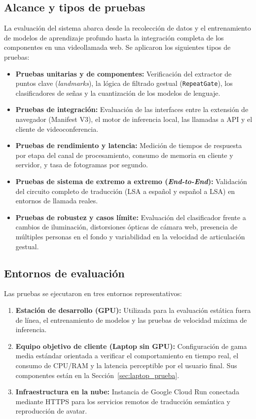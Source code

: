 \subsection{Alcance y tipos de pruebas}
La evaluación del sistema abarca desde la recolección de datos y el entrenamiento de modelos de aprendizaje profundo hasta la integración completa de los componentes en una videollamada web. Se aplicaron los siguientes tipos de pruebas:
\begin{itemize}
    \item \textbf{Pruebas unitarias y de componentes:} Verificación del extractor de puntos clave (\textit{landmarks}), la lógica de filtrado gestual (\texttt{RepeatGate}), los clasificadores de señas y la cuantización de los modelos de lenguaje.
    \item \textbf{Pruebas de integración:} Evaluación de las interfaces entre la extensión de navegador (Manifest V3), el motor de inferencia local, las llamadas a API y el cliente de videoconferencia.
    \item \textbf{Pruebas de rendimiento y latencia:} Medición de tiempos de respuesta por etapa del canal de procesamiento, consumo de memoria en cliente y servidor, y tasa de fotogramas por segundo.
    \item \textbf{Pruebas de sistema de extremo a extremo (\textit{End-to-End}):} Validación del circuito completo de traducción (LSA a español y español a LSA) en entornos de llamada reales.
    \item \textbf{Pruebas de robustez y casos límite:} Evaluación del clasificador frente a cambios de iluminación, distorsiones ópticas de cámara web, presencia de múltiples personas en el fondo y variabilidad en la velocidad de articulación gestual.
\end{itemize}

\subsection{Entornos de evaluación}
Las pruebas se ejecutaron en tres entornos representativos:
\begin{enumerate}
    \item \textbf{Estación de desarrollo (GPU):} Utilizada para la evaluación estática fuera de línea, el entrenamiento de modelos y las pruebas de velocidad máxima de inferencia.
    \item \textbf{Equipo objetivo de cliente (Laptop sin GPU):} Configuración de gama media estándar orientada a verificar el comportamiento en tiempo real, el consumo de CPU/RAM y la latencia perceptible por el usuario final. Sus componentes están en la Sección~\ref{sec:laptop_prueba}.
    \item \textbf{Infraestructura en la nube:} Instancia de Google Cloud Run conectada mediante HTTPS para los servicios remotos de traducción semántica y reproducción de avatar.
\end{enumerate}

